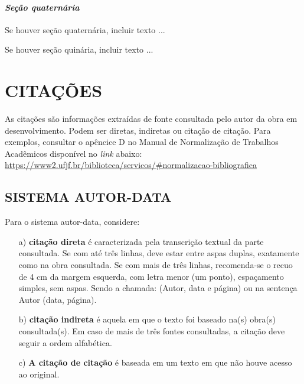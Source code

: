 \documentclass[
        oneside,      %
        english,			
        brazil			 
        ]{abntbibufjf}
\begin{document}

\subsubsection{\textit{Se\c{c}\~ao quatern\'aria}} %

Se houver se\c{c}\~ao quatern\'aria, incluir texto ...


Se houver se\c{c}\~ao quin\'aria, incluir texto ...


\chapter{CITA\c{C}\~{O}ES} %

As citações são informa\c{c}\~{o}es extra\'idas de fonte consultada pelo autor da obra em desenvolvimento. Podem ser diretas, indiretas ou citação de citação. Para exemplos, consultar o apêncice D no Manual de Normalização de Trabalhos Acadêmicos disponível no \textit{link} abaixo: \\ 
\url{https://www2.ufjf.br/biblioteca/servicos/#normalizacao-bibliografica}

\section{SISTEMA AUTOR-DATA} %

Para o sistema autor-data, considere: 
\begin{itemize}
 \item[a)] \textbf{citação direta} \'e caracterizada pela transcri\c{c}\~{a}o textual da parte consultada. Se com at\'e tr\^es linhas, deve estar entre aspas duplas, exatamente como na obra consultada. Se com mais de tr\^es linhas, recomenda-se o recuo de 4 cm da margem esquerda, com letra menor (um ponto), espaçamento simples, sem aspas. Sendo a chamada: (Autor, data e p\'agina) ou na senten\c{c}a Autor (data, p\'agina).
 \item[b)] \textbf{cita\c{c}\~{a}o indireta} \'e aquela em que o texto foi baseado na(s) obra(s) consultada(s). Em caso de mais de tr\^es fontes consultadas, a cita\c{c}\~{a}o deve seguir a ordem alfab\'etica. 
 \item[c)] \textbf{A cita\c{c}\~{a}o de cita\c{c}\~{a}o} \'e baseada em um texto em que n\~ao houve acesso ao original. 
\end{itemize} 
\end{document}
